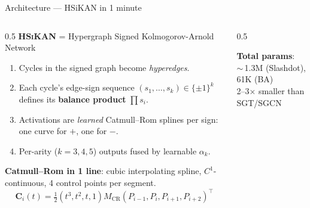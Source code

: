 \documentclass[10pt,aspectratio=169]{beamer}
\newcommand{\HSiKAN}{\textsc{HSiKAN}}
\begin{document}
\begin{frame}{Architecture --- HSiKAN in 1 minute}

\begin{columns}[T]
\begin{column}{0.5\textwidth}
\textbf{\HSiKAN{}} = Hypergraph Signed Kolmogorov-Arnold Network
\smallskip
\begin{enumerate}
\item Cycles in the signed graph become \emph{hyperedges}.
\item Each cycle's edge-sign sequence
      $(s_1, \ldots, s_k) \in \{\pm 1\}^k$ defines its
      \textbf{balance product} $\prod s_i$.
\item Activations are \emph{learned} Catmull--Rom splines per sign:
      one curve for $+$, one for $-$.
\item Per-arity ($k{=}3, 4, 5$) outputs fused by learnable
      $\alpha_k$.
\end{enumerate}

\smallskip
\textbf{Catmull--Rom in 1 line}: cubic interpolating spline,
$C^1$-continuous, 4 control points per segment.
\[
\mathbf{C}_i(t) = \tfrac{1}{2}(t^3, t^2, t, 1) M_{\mathrm{CR}}
(P_{i-1}, P_i, P_{i+1}, P_{i+2})^\top
\]

\end{column}
\begin{column}{0.5\textwidth}
\centering
{}

\smallskip
\textbf{Total params}:\\
$\sim$\,1.3M (Slashdot), 61K (BA)
\\[2pt]
2--3$\times$ smaller than SGT/SGCN
\end{column}
\end{columns}
\end{frame}
\end{document}
